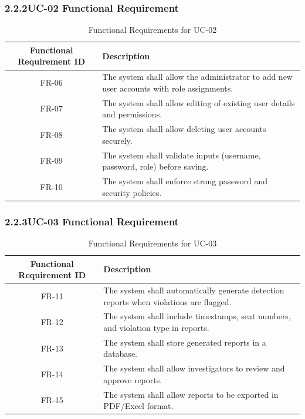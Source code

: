 \subsubsection*{2.2.2\quad UC-02 Functional Requirement}
\vspace{-0.5em}
\begin{table}[H]
\caption{Functional Requirements for UC-02}
\centering
\begin{tabular}{|c|p{11cm}|}
\hline
\textbf{Functional Requirement ID} & \textbf{Description} \\ \hline
FR-06 & The system shall allow the administrator to add new user accounts with role assignments. \\ \hline
FR-07 & The system shall allow editing of existing user details and permissions. \\ \hline
FR-08 & The system shall allow deleting user accounts securely. \\ \hline
FR-09 & The system shall validate inputs (username, password, role) before saving. \\ \hline
FR-10 & The system shall enforce strong password and security policies. \\ \hline
\end{tabular}
\end{table}

\subsubsection*{2.2.3\quad UC-03 Functional Requirement}
\vspace{-0.5em}
\begin{table}[H]
\caption{Functional Requirements for UC-03}
\centering
\begin{tabular}{|c|p{11cm}|}
\hline
\textbf{Functional Requirement ID} & \textbf{Description} \\ \hline
FR-11 & The system shall automatically generate detection reports when violations are flagged. \\ \hline
FR-12 & The system shall include timestamps, seat numbers, and violation type in reports. \\ \hline
FR-13 & The system shall store generated reports in a database. \\ \hline
FR-14 & The system shall allow investigators to review and approve reports. \\ \hline
FR-15 & The system shall allow reports to be exported in PDF/Excel format. \\ \hline
\end{tabular}
\end{table}

